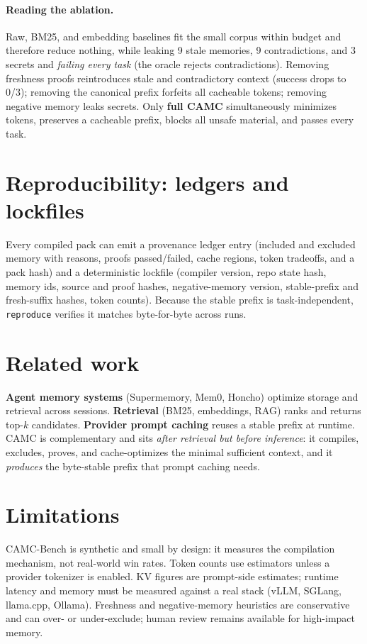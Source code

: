 \documentclass[11pt]{article}
\begin{document}
\paragraph{Reading the ablation.} Raw, BM25, and embedding baselines fit the small
corpus within budget and therefore reduce nothing, while leaking 9 stale memories,
9 contradictions, and 3 secrets and \emph{failing every task} (the oracle rejects
contradictions). Removing freshness proofs reintroduces stale and contradictory
context (success drops to 0/3); removing the canonical prefix forfeits all cacheable
tokens; removing negative memory leaks secrets. Only \textbf{full CAMC}
simultaneously minimizes tokens, preserves a cacheable prefix, blocks all unsafe
material, and passes every task.

\section{Reproducibility: ledgers and lockfiles}

Every compiled pack can emit a provenance ledger entry (included and excluded
memory with reasons, proofs passed/failed, cache regions, token tradeoffs, and a
pack hash) and a deterministic lockfile (compiler version, repo state hash, memory
ids, source and proof hashes, negative-memory version, stable-prefix and
fresh-suffix hashes, token counts). Because the stable prefix is task-independent,
\texttt{reproduce} verifies it matches byte-for-byte across runs.

\section{Related work}

\textbf{Agent memory systems} (Supermemory, Mem0, Honcho) optimize storage and
retrieval across sessions. \textbf{Retrieval} (BM25, embeddings, RAG) ranks and
returns top-$k$ candidates. \textbf{Provider prompt caching} reuses a stable prefix
at runtime. CAMC is complementary and sits \emph{after retrieval but before
inference}: it compiles, excludes, proves, and cache-optimizes the minimal
sufficient context, and it \emph{produces} the byte-stable prefix that prompt
caching needs.

\section{Limitations}

CAMC-Bench is synthetic and small by design: it measures the compilation mechanism,
not real-world win rates. Token counts use estimators unless a provider tokenizer is
enabled. KV figures are prompt-side estimates; runtime latency and memory must be
measured against a real stack (vLLM, SGLang, llama.cpp, Ollama). Freshness and
negative-memory heuristics are conservative and can over- or under-exclude; human
review remains available for high-impact memory.
\end{document}
